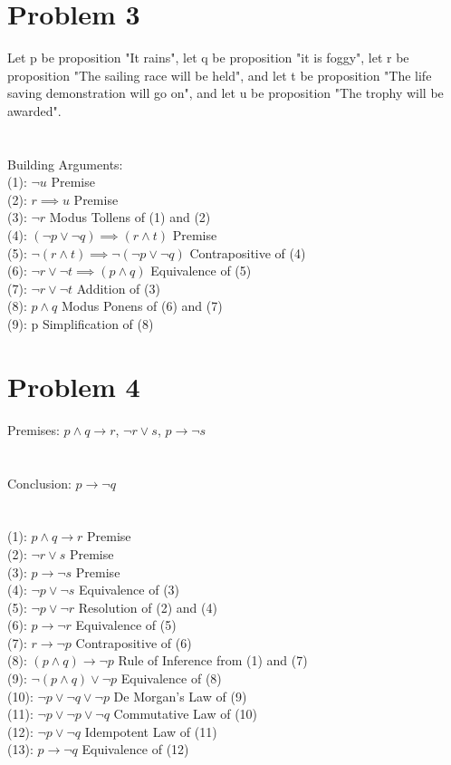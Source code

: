 \documentclass{article}
\begin{document}
\section{Problem 3}
Let p be proposition "It rains", let q be proposition "it is foggy", let r be proposition "The sailing race will be held", and let t be proposition "The life saving demonstration will go on", and let u be proposition "The trophy will be awarded".\\
\\ \hspace*{\fill} \\
Building Arguments:\\
(1): $\neg u$ Premise\\
(2): $r \implies u$ Premise\\
(3): $\neg r$ Modus Tollens of (1) and (2)\\
(4): $(\neg p \vee \neg q) \implies (r \wedge t)$ Premise\\
(5): $\neg (r \wedge t) \implies \neg (\neg p \vee \neg q)$ Contrapositive of (4)\\
(6): $\neg r \vee \neg t \implies (p \wedge q)$ Equivalence of (5)\\
(7): $\neg r \vee \neg t$ Addition of (3)\\
(8): $p \wedge q$ Modus Ponens of (6) and (7)\\
(9): p Simplification of (8)\\


\section{Problem 4}
Premises: $p \wedge q \rightarrow r$, $\neg r \vee s$, $p \rightarrow \neg s$\\
\\ \hspace*{\fill} \\
Conclusion: $p \rightarrow \neg q$\\
\\ \hspace*{\fill} \\
(1): $p \wedge q \rightarrow r$ Premise\\
(2): $\neg r \vee s$ Premise\\
(3): $p \rightarrow \neg s$ Premise\\
(4): $\neg p \vee \neg s$ Equivalence of (3)\\
(5): $\neg p \vee \neg r$ Resolution of (2) and (4)\\
(6): $p \rightarrow \neg r$ Equivalence of (5)\\
(7): $r \rightarrow \neg p$ Contrapositive of (6)\\
(8): $(p \wedge q) \rightarrow \neg p$ Rule of Inference from (1) and (7)\\
(9): $\neg (p \wedge q) \vee \neg p$ Equivalence of (8)\\
(10): $\neg p \vee \neg q \vee \neg p$ De Morgan's Law of (9)\\
(11): $\neg p \vee \neg p \vee \neg q$ Commutative Law of (10)\\
(12): $\neg p \vee \neg q$ Idempotent Law of (11)\\
(13): $p \rightarrow \neg q$ Equivalence of (12)\\
\end{document}
